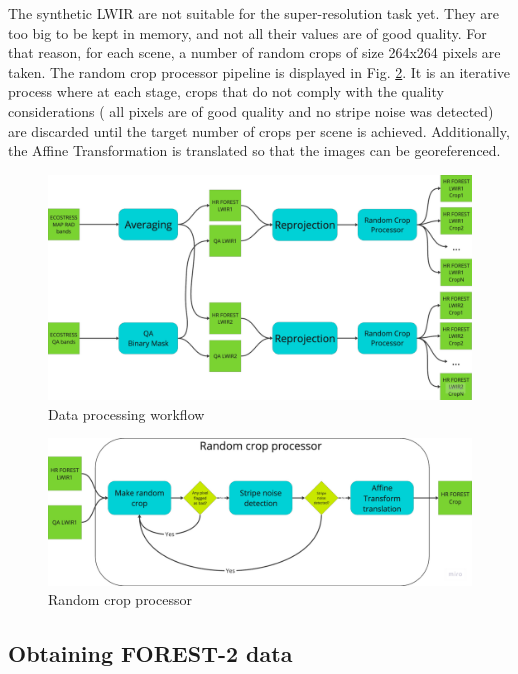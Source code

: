The synthetic LWIR are not suitable for the super-resolution task yet. They are too big to be kept in memory, and not all their values are of good quality. For that reason, for each scene, a number of random crops of size 264x264 pixels are taken. The random crop processor pipeline is displayed in Fig. \ref{fig:5-random_crop_processor}. It is an iterative process where at each stage, crops that do not comply with the quality considerations ( all pixels are of good quality and no stripe noise was detected) are discarded until the target number of crops per scene is achieved. Additionally, the Affine Transformation is translated so that the images can be georeferenced.


\begin{figure}[H]
    \centering
    \includegraphics[width=\linewidth]{Includes/5-data_processing_flow_chart.pdf}
    \caption{Data processing workflow}
    \label{fig:5-data_processing_flow_chart}
\end{figure}

\begin{figure}[H]
    \centering
    \includegraphics[width=\linewidth]{Includes/5-random_crop_processor.pdf}
    \caption{Random crop processor}
    \label{fig:5-random_crop_processor}
\end{figure}



\subsection{Obtaining FOREST-2 data}

